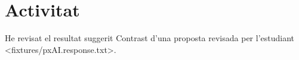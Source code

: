 \documentclass[CAT,ai-full,no-cover,no-toc]{P3CTeX}
\begin{document}
\section{Activitat}
He revisat el resultat suggerit
  {Contrast d'una proposta revisada per l'estudiant}
  <fixtures/pxAI.response.txt>.
\end{document}
